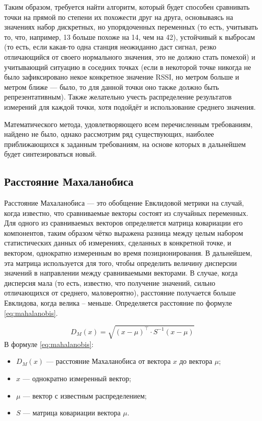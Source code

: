 Таким образом, требуется найти алгоритм, который будет способен сравнивать точки на прямой по степени их похожести друг на друга, основываясь на значениях набор дискретных, но упорядоченных переменных (то есть, учитывать то, что, например, 13 больше похоже на 14, чем на 42), устойчивый к выбросам (то есть, если какая-то одна станция неожиданно даст сигнал, резко отличающийся от своего нормального значения, это не должно стать помехой) и учитывающий ситуацию в соседних точках (если в некоторой точке никогда не было зафиксировано некое конкретное значение RSSI, но метром больше и метром ближе --- было, то для данной точки оно также должно быть репрезентативным). Также желательно учесть распределение результатов измерений для каждой точки, хотя подойдёт и использование среднего значения.

Математического метода, удовлетворяющего всем перечисленным требованиям, найдено не было, однако рассмотрим ряд существующих, наиболее приближающихся к заданным требованиям, на основе которых в дальнейшем будет синтезироваться новый.

\subsection{Расстояние Махаланобиса}
\label{subsec:mahalanobis}
Расстояние Махаланобиса --- это обобщение Евклидовой метрики на случай, когда известно, что сравниваемые векторы состоят из случайных переменных\cite{mahalanobis}. Для одного из сравниваемых векторов определяется матрица ковариации его компонентов, таким образом чётко выражена разница между целым набором статистических данных об измерениях, сделанных в конкретной точке, и вектором, однократно измеренным во время позиционирования. В дальнейшем, эта матрица используется для того, чтобы определить величину дисперсии значений в направлении между сравниваемыми векторами. В случае, когда дисперсия мала (то есть, известно, что получение значений, сильно отличающихся от среднего, маловероятно), расстояние получается больше Евклидова, когда велика -- меньше. Определяется расстояние по формуле \ref{eq:mahalanobis}.

\begin{equation}
	D_M(x) = \sqrt{(x - \mu{})^\intercal{}\cdot{}S^{-1}(x-\mu)}
	\label{eq:mahalanobis}
\end{equation}
В формуле \ref{eq:mahalanobis}:
\begin{itemize}
	\item
		{\bf$D_M(x)$} --- расстояние Махаланобиса от вектора $x$ до вектора $\mu$;
	\item
		{\bf$x$} --- однократно измеренный вектор;
	\item
		{\bf$\mu$} --- вектор с известным распределением;
	\item
		{\bf$S$} --- матрица ковариации вектора $\mu$.
\end{itemize}


